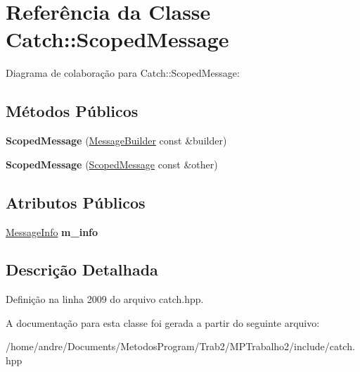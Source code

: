 \hypertarget{classCatch_1_1ScopedMessage}{}\section{Referência da Classe Catch\+:\+:Scoped\+Message}
\label{classCatch_1_1ScopedMessage}


Diagrama de colaboração para Catch\+:\+:Scoped\+Message\+:
\subsection*{Métodos Públicos}
\begin{DoxyCompactItemize}
\item 
{\bfseries Scoped\+Message} (\hyperlink{structCatch_1_1MessageBuilder}{Message\+Builder} const \&builder)\hypertarget{classCatch_1_1ScopedMessage_a5cc59f0f2ebe840e6607f83004d49a17}{}\label{classCatch_1_1ScopedMessage_a5cc59f0f2ebe840e6607f83004d49a17}

\item 
{\bfseries Scoped\+Message} (\hyperlink{classCatch_1_1ScopedMessage}{Scoped\+Message} const \&other)\hypertarget{classCatch_1_1ScopedMessage_ae03a17fd47220d563d4abc73e7518e29}{}\label{classCatch_1_1ScopedMessage_ae03a17fd47220d563d4abc73e7518e29}

\end{DoxyCompactItemize}
\subsection*{Atributos Públicos}
\begin{DoxyCompactItemize}
\item 
\hyperlink{structCatch_1_1MessageInfo}{Message\+Info} {\bfseries m\+\_\+info}\hypertarget{classCatch_1_1ScopedMessage_ae6e1476f389cc6e1586f033b3747b27b}{}\label{classCatch_1_1ScopedMessage_ae6e1476f389cc6e1586f033b3747b27b}

\end{DoxyCompactItemize}


\subsection{Descrição Detalhada}


Definição na linha 2009 do arquivo catch.\+hpp.



A documentação para esta classe foi gerada a partir do seguinte arquivo\+:\begin{DoxyCompactItemize}
\item 
/home/andre/\+Documents/\+Metodos\+Program/\+Trab2/\+M\+P\+Trabalho2/include/catch.\+hpp\end{DoxyCompactItemize}
